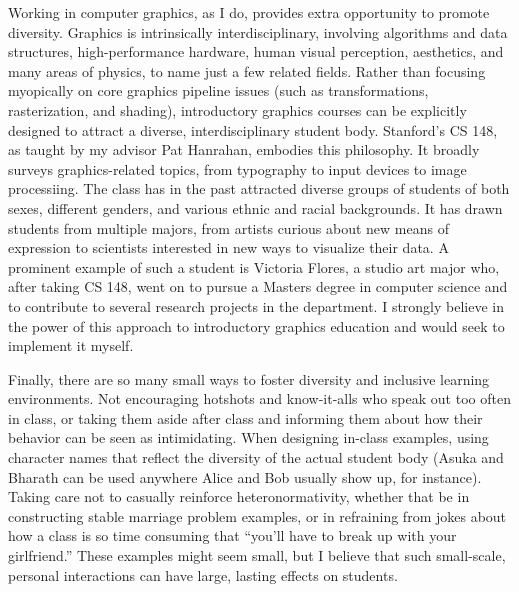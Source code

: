 \documentclass[
10pt, %
a4paper, %
oneside, %
headinclude,footinclude, %
BCOR5mm, %
]{scrartcl}
\begin{document}
Working in computer graphics, as I do, provides extra opportunity to promote diversity. Graphics is intrinsically interdisciplinary, involving algorithms and data structures, high-performance hardware, human visual perception, aesthetics, and many areas of physics, to name just a few related fields. Rather than focusing myopically on core graphics pipeline issues (such as transformations, rasterization, and shading), introductory graphics courses can be explicitly designed to attract a diverse, interdisciplinary student body. Stanford's CS 148, as taught by my advisor Pat Hanrahan, embodies this philosophy. It broadly surveys graphics-related topics, from typography to input devices to image processiing. The class has in the past attracted diverse groups of students of both sexes, different genders, and various ethnic and racial backgrounds. It has drawn students from multiple majors, from artists curious about new means of expression to scientists interested in new ways to visualize their data. A prominent example of such a student is Victoria Flores, a studio art major who, after taking CS 148, went on to pursue a Masters degree in computer science and to contribute to several research projects in the department. I strongly believe in the power of this approach to introductory graphics education and would seek to implement it myself.

Finally, there are so many small ways to foster diversity and inclusive learning environments. Not encouraging hotshots and know-it-alls who speak out too often in class, or taking them aside after class and informing them about how their behavior can be seen as intimidating. When designing in-class examples, using character names that reflect the diversity of the actual student body (Asuka and Bharath can be used anywhere Alice and Bob usually show up, for instance). Taking care not to casually reinforce heteronormativity, whether that be in constructing stable marriage problem examples, or in refraining from jokes about how a class is so time consuming that ``you'll have to break up with your girlfriend.'' These examples might seem small, but I believe that such small-scale, personal interactions can have large, lasting effects on students.




\end{document}
